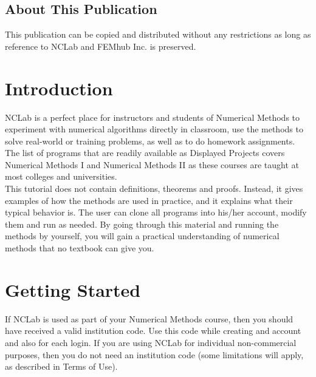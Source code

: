 \documentclass[article,A4,12pt]{llncs}
\begin{document}
\subsection*{About This Publication}
This publication can be copied and distributed without any restrictions
as long as reference to NCLab and FEMhub Inc. is preserved.


\normalsize

\newpage
\setcounter{tocdepth}{2}
\tableofcontents

\newpage

\pagestyle{plain}
\setcounter{page}{1}


\section{Introduction}

NCLab is a perfect place for instructors and students of Numerical Methods 
to experiment with numerical algorithms directly in classroom, use the methods
to solve real-world or training problems, as well as to do homework assignments. 
The list of programs that are readily available as Displayed Projects covers 
Numerical Methods I and Numerical Methods II as these courses are 
taught at most colleges and universities. \\

\noindent
This tutorial does not contain definitions, theorems and proofs. Instead, it 
gives examples of how the methods are used in practice, and it explains what 
their typical behavior is. The user can clone all programs into his/her account,
modify them and run as needed.
By going through this material and running the methods by yourself, you will 
gain a practical understanding of numerical methods that no textbook can give you. 

\section{Getting Started}

If NCLab is used as part of your Numerical Methods course, then you should 
have received a valid institution code. Use this code while creating 
and account and also for each login. If you are using NCLab for individual
non-commercial purposes, then you do not need an institution code (some 
limitations will apply, as described in Terms of Use). \\
\end{document}

